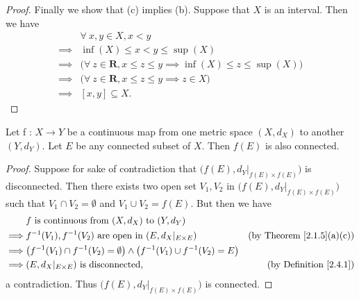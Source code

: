 \begin{proof}
    Finally we show that (c) implies (b).
    Suppose that \(X\) is an interval.
    Then we have
    \begin{align*}
                 & \forall\ x, y \in X, x < y                                                                \\
        \implies & \inf(X) \leq x < y \leq \sup(X)                                                           \\
        \implies & \big(\forall\ z \in \mathbf{R}, x \leq z \leq y \implies \inf(X) \leq z \leq \sup(X)\big) \\
        \implies & \big(\forall\ z \in \mathbf{R}, x \leq z \leq y \implies z \in X\big)                     \\
        \implies & [x, y] \subseteq X.
    \end{align*}
\end{proof}

\begin{theorem}\label{2.4.6}
    Let f : \(X \to Y\) be a continuous map from one metric space \((X, d_X)\) to another \((Y, d_Y)\).
    Let \(E\) be any connected subset of \(X\).
    Then \(f(E)\) is also connected.
\end{theorem}

\begin{proof}
    Suppose for sake of contradiction that \(\big(f(E), d_Y|_{f(E) \times f(E)}\big)\) is disconnected.
    Then there exists two open set \(V_1, V_2\) in \(\big(f(E), d_Y|_{f(E) \times f(E)}\big)\) such that \(V_1 \cap V_2 = \emptyset\) and \(V_1 \cup V_2 = f(E)\).
    But then we have
    \begin{align*}
                 & f \text{ is continuous from } (X, d_X) \text{ to } (Y, d_Y)                                                                                 \\
        \implies & f^{-1}(V_1), f^{-1}(V_2) \text{ are open in } (E, d_X|_{E \times E})                                & \text{(by Theorem \ref{2.1.5}(a)(c))} \\
        \implies & \big(f^{-1}(V_1) \cap f^{-1}(V_2) = \emptyset\big) \land \big(f^{-1}(V_1) \cup f^{-1}(V_2) = E\big)                                         \\
        \implies & (E, d_X|_{E \times E}) \text{ is disconnected},                                                     & \text{(by Definition \ref{2.4.1})}
    \end{align*}
    a contradiction.
    Thus \(\big(f(E), d_Y|_{f(E) \times f(E)}\big)\) is connected.
\end{proof}

